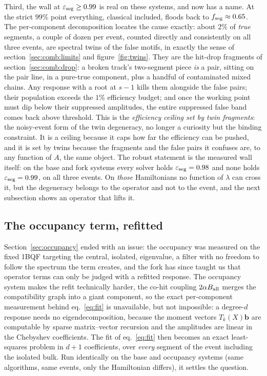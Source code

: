 \documentclass[11pt,a4paper]{article}
\newcommand{\eff}{\ensuremath{\varepsilon_{\rm seg}}}
\newcommand{\far}{\ensuremath{f_{\rm seg}}}
\begin{document}
Third, the wall at $\eff\ge0.99$ is real on these systems, and now
has a name. At the strict $99\%$ point everything, classical
included, floods back to $\far\approx0.65$. The per-component
decomposition locates the cause exactly: about $2\%$ of \emph{true}
segments, a couple of dozen per event, counted directly and
consistently on all three events, are spectral twins of the false
motifs, in exactly the sense of
section~\ref{sec:comb:limits} and figure~\ref{fig:twins}. They are
the hit-drop fragments of section~\ref{sec:comb:drop}: a broken
track's two-segment piece \emph{is} a pair, sitting on the pair
line, in a pure-true component, plus a handful of contaminated mixed
chains. Any response with a root at $s-1$ kills them alongside the
false pairs; their population exceeds the $1\%$ efficiency budget;
and once the working point must dip below their suppressed
amplitudes, the entire suppressed false band comes back above
threshold. This is the \emph{efficiency ceiling set by twin
fragments}: the noisy-event form of the twin degeneracy,
no longer a curiosity but the binding constraint. It is a
ceiling because it caps how far the efficiency can be pushed, and it
is set by twins because the fragments and the false pairs it confuses
are, to any function of $A$, the same object. The robust statement is the measured wall
itself: on the base and fork systems every solver holds
$\eff=0.98$ and none holds $\eff=0.99$, on all three events. On
\emph{those} Hamiltonians no function of $\lambda$ can cross it,
but the degeneracy belongs to the operator and not to the
event, and the next subsection shows an operator that lifts it.
\label{sec:fit:degeneracy}

\subsection{The occupancy term, refitted}
\label{sec:fit:occ}

Section~\ref{sec:occupancy} ended with an issue: the occupancy was measured on the fixed 1BQF targeting the central, isolated, eigenvalue, a filter with no freedom to follow the
spectrum the term creates, and the fork has since taught us that
operator terms can only be judged with a refitted response. The
occupancy system makes the refit technically harder, the co-hit
coupling $2\alpha B_{\rm all}$ merges the compatibility graph into a
giant component, so the exact per-component measurement behind
eq.~\eqref{eq:fit} is unavailable, but not impossible: a degree-$d$
response needs no eigendecomposition, because the moment vectors
$T_k(X)\mathbf{b}$ are computable by sparse matrix--vector recursion
and the amplitudes are linear in the Chebyshev coefficients. The fit
of eq.~\eqref{eq:fit} then becomes an exact least-squares problem in
$d{+}1$ coefficients, over \emph{every} segment of the event
including the isolated bulk. Run identically on the base and
occupancy systems (same algorithms, same events, only the Hamiltonian
differs), it settles the question.
\end{document}
